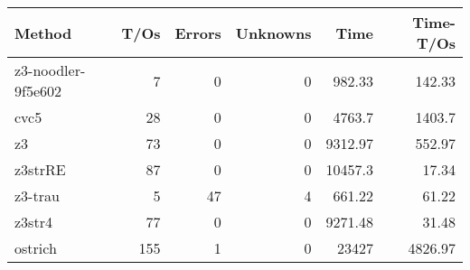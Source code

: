\begin{tabular}{lrrrrr}
\hline
 Method             &   T/Os &   Errors &   Unknowns &     Time &   Time-T/Os \\
\hline
 z3-noodler-9f5e602 &      7 &        0 &          0 &   982.33 &      142.33 \\
 cvc5               &     28 &        0 &          0 &  4763.7  &     1403.7  \\
 z3                 &     73 &        0 &          0 &  9312.97 &      552.97 \\
 z3strRE            &     87 &        0 &          0 & 10457.3  &       17.34 \\
 z3-trau            &      5 &       47 &          4 &   661.22 &       61.22 \\
 z3str4             &     77 &        0 &          0 &  9271.48 &       31.48 \\
 ostrich            &    155 &        1 &          0 & 23427    &     4826.97 \\
\hline
\end{tabular}
